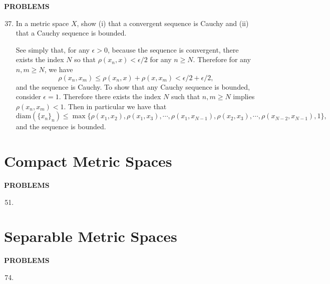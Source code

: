 \begin{center}
	\textbf{PROBLEMS}
\end{center}
\begin{enumerate}
    \setcounter{enumi}{36}
    \item In a metric space $X$, show (i) that a convergent sequence is Cauchy and (ii) that a Cauchy sequence is bounded.
    
    See simply that, for any $\epsilon>0$, because the sequence is convergent, there exists the index $N$ so that $\rho(x_n,x)<\epsilon/2$ for any $n\ge N$.
    Therefore for any $n,m\ge N$, we have
    \[
        \rho(x_n,x_m)\le \rho(x_n,x)+\rho(x,x_m)<\epsilon/2+\epsilon/2,
    \]
    and the sequence is Cauchy.
    To show that any Cauchy sequence is bounded, consider $\epsilon=1$.
    Therefore there exists the index $N$ such that $n,m\ge N$ implies $\rho(x_n,x_m)<1$.
    Then in particular we have that 
    \[
        \text{diam}(\{x_n\}_n)\le \max\{\rho(x_1,x_2),\rho(x_1,x_3),\cdots,\rho(x_1,x_{N-1}),\rho(x_2,x_3),\cdots,\rho(x_{N-2},x_{N-1}),1\},
    \]
    and the sequence is bounded.
\end{enumerate}

\section{Compact Metric Spaces}

\begin{center}
	\textbf{PROBLEMS}
\end{center}
\begin{enumerate}
    \setcounter{enumi}{50}
    \item 
\end{enumerate}

\section{Separable Metric Spaces}
\begin{center}
	\textbf{PROBLEMS}
\end{center}
\begin{enumerate}
    \setcounter{enumi}{73}
    \item 
\end{enumerate}
